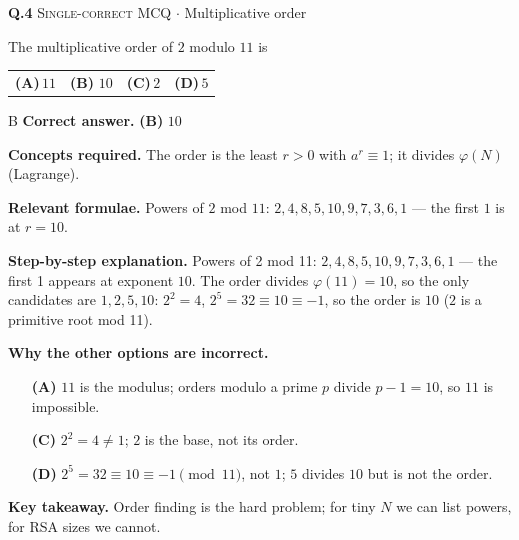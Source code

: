 \documentclass[11pt,a4paper]{article}
\newcommand{\optlabel}[1]{\textbf{(#1)}}
\newcommand{\correctlabel}[1]{\textcolor{okgreen}{\textbf{(#1)}\,\ding{51}}}
\newenvironment{qitem}[1]{\begin{list}{}{\setlength{\leftmargin}{3.3em}\setlength{\labelwidth}{3.1em}%
  \setlength{\labelsep}{0.2em}\setlength{\topsep}{3pt}\setlength{\parsep}{3pt}}\item[\textbf{Q.#1}\hfill]}{\end{list}}
\newcommand{\qsep}{\par\vspace{2pt}{\color{black!15}\hrule}\vspace{4pt}}
\newcommand{\qmeta}[2]{{\footnotesize\color{black!60}\textsc{#1} \;$\cdot$\; #2}\par}
\begin{document}
\begin{qitem}{4}
\qmeta{Single-correct MCQ}{Multiplicative order}
The multiplicative order of $2$ modulo $11$ is
\par\smallskip\noindent\begin{tabularx}{\linewidth}{@{}*{4}{L}@{}}
\optlabel{A}\,$11$ & \correctlabel{B}\,$10$ & \optlabel{C}\,$2$ & \optlabel{D}\,$5$
\end{tabularx}
\end{qitem}
\begin{solbox}{B}
\textbf{\color{brand}Correct answer.} \textcolor{okgreen}{\textbf{(B)}} $10$

\textbf{\color{brand}Concepts required.} The order is the least $r > 0$ with $a^r \equiv 1$; it divides $\varphi(N)$ (Lagrange).

\textbf{\color{brand}Relevant formulae.} Powers of $2$ mod $11$: $2, 4, 8, 5, 10, 9, 7, 3, 6, 1$ --- the first $1$ is at $r = 10$.

\textbf{\color{brand}Step-by-step explanation.} Powers of 2 mod 11: $2, 4, 8, 5, 10, 9, 7, 3, 6, 1$ --- the first 1 appears at exponent $10$. The order divides $\varphi(11) = 10$, so the only
candidates are $1, 2, 5, 10$: $2^2 = 4$, $2^5 = 32 \equiv 10 \equiv -1$, so the order is $10$ ($2$ is a primitive root mod 11).

\textbf{\color{brand}Why the other options are incorrect.}
\begin{itemize}[leftmargin=2.4em, itemsep=1pt, topsep=2pt]
\item[\textbf{(A)}] $11$ is the modulus; orders modulo a prime $p$ divide $p - 1 = 10$, so $11$ is impossible.
\item[\textbf{(C)}] $2^2 = 4 \ne 1$; $2$ is the base, not its order.
\item[\textbf{(D)}] $2^5 = 32 \equiv 10 \equiv -1 \pmod{11}$, not $1$; $5$ divides $10$ but is not the order.
\end{itemize}
\textbf{\color{brand}Key takeaway.} Order finding is the hard problem; for tiny $N$ we can list powers, for RSA sizes we cannot.
\end{solbox}
\qsep
\end{document}
